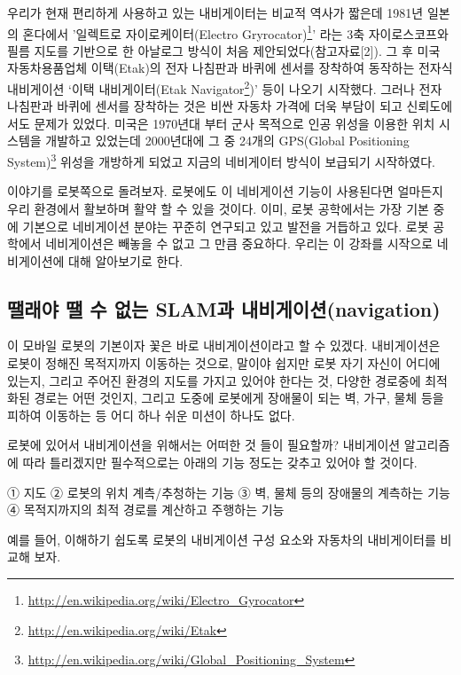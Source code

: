 우리가 현재 편리하게 사용하고 있는 내비게이터는 비교적 역사가 짧은데 1981년 일본의 혼다에서 '일렉트로 자이로케이터(Electro Gryrocator)\footnote{\url{http://en.wikipedia.org/wiki/Electro_Gyrocator}}’ 라는 3축 자이로스코프와 필름 지도를 기반으로 한 아날로그 방식이 처음 제안되었다(참고자료[2]). 그 후 미국 자동차용품업체 이택(Etak)의 전자 나침판과 바퀴에 센서를 장착하여 동작하는 전자식 내비게이션 ‘이택 내비게이터(Etak Navigator\footnote{\url{http://en.wikipedia.org/wiki/Etak}})’ 등이 나오기 시작했다. 그러나 전자 나침판과 바퀴에 센서를 장착하는 것은 비싼 자동차 가격에 더욱 부담이 되고 신뢰도에서도 문제가 있었다. 미국은 1970년대 부터 군사 목적으로 인공 위성을 이용한 위치 시스템을 개발하고 있었는데 2000년대에 그 중 24개의 GPS(Global Positioning System)\footnote{\url{http://en.wikipedia.org/wiki/Global_Positioning_System}} 위성을 개방하게 되었고 지금의 네비게이터 방식이 보급되기 시작하였다.

이야기를 로봇쪽으로 돌려보자. 로봇에도 이 네비게이션 기능이 사용된다면 얼마든지 우리 환경에서 활보하며 활약 할 수 있을 것이다. 이미, 로봇 공학에서는 가장 기본 중에 기본으로 네비게이션 분야는 꾸준히 연구되고 있고 발전을 거듭하고 있다. 로봇 공학에서 네비게이션은 빼놓을 수 없고 그 만큼 중요하다. 우리는 이 강좌를 시작으로 네비게이션에 대해 알아보기로 한다.

\subsection{땔래야 땔 수 없는 SLAM과 내비게이션(navigation)}

이 모바일 로봇의 기본이자 꽃은 바로 내비게이션이라고 할 수 있겠다. 내비게이션은 로봇이 정해진 목적지까지 이동하는 것으로, 말이야 쉽지만 로봇 자기 자신이 어디에 있는지, 그리고 주어진 환경의 지도를 가지고 있어야 한다는 것, 다양한 경로중에 최적화된 경로는 어떤 것인지, 그리고 도중에 로봇에게 장애물이 되는 벽, 가구, 물체 등을 피하여 이동하는 등 어디 하나 쉬운 미션이 하나도 없다. 


로봇에 있어서 내비게이션을 위해서는 어떠한 것 들이 필요할까? 내비게이션 알고리즘에 따라 틀리겠지만 필수적으로는 아래의 기능 정도는 갖추고 있어야 할 것이다. 

① 지도
② 로봇의 위치 계측/추청하는 기능
③ 벽, 물체 등의 장애물의 계측하는 기능
④ 목적지까지의 최적 경로를 계산하고 주행하는 기능

예를 들어, 이해하기 쉽도록 로봇의 내비게이션 구성 요소와 자동차의 내비게이터를 비교해 보자.

